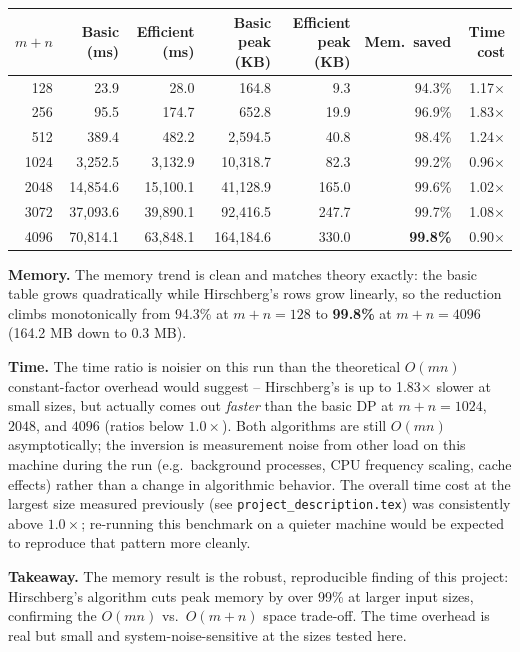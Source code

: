 \documentclass[11pt]{article}
\begin{document}
\begin{center}
\begin{tabular}{r r r r r r r}
\toprule
$m+n$ & Basic (ms) & Efficient (ms) & Basic peak (KB) & Efficient peak (KB) & Mem.\ saved & Time cost \\
\midrule
128  & 23.9    & 28.0    & 164.8     & 9.3   & 94.3\% & 1.17$\times$ \\
256  & 95.5    & 174.7   & 652.8     & 19.9  & 96.9\% & 1.83$\times$ \\
512  & 389.4   & 482.2   & 2{,}594.5 & 40.8  & 98.4\% & 1.24$\times$ \\
1024 & 3{,}252.5 & 3{,}132.9 & 10{,}318.7 & 82.3  & 99.2\% & 0.96$\times$ \\
2048 & 14{,}854.6 & 15{,}100.1 & 41{,}128.9 & 165.0 & 99.6\% & 1.02$\times$ \\
3072 & 37{,}093.6 & 39{,}890.1 & 92{,}416.5 & 247.7 & 99.7\% & 1.08$\times$ \\
4096 & 70{,}814.1 & 63{,}848.1 & 164{,}184.6 & 330.0 & \textbf{99.8\%} & 0.90$\times$ \\
\bottomrule
\end{tabular}
\end{center}

\textbf{Memory.} The memory trend is clean and matches theory exactly: the
basic table grows quadratically while Hirschberg's rows grow linearly, so the
reduction climbs monotonically from 94.3\% at $m+n=128$ to \textbf{99.8\%} at
$m+n=4096$ (164.2 MB down to 0.3 MB).

\textbf{Time.} The time ratio is noisier on this run than the theoretical
$O(mn)$ constant-factor overhead would suggest -- Hirschberg's is up to
1.83$\times$ slower at small sizes, but actually comes out \emph{faster} than
the basic DP at $m+n = 1024$, $2048$, and $4096$ (ratios below $1.0\times$).
Both algorithms are still $O(mn)$ asymptotically; the inversion is measurement
noise from other load on this machine during the run (e.g.\ background
processes, CPU frequency scaling, cache effects) rather than a change in
algorithmic behavior. The overall time cost at the largest size measured
previously (see \texttt{project\_description.tex}) was consistently above
$1.0\times$; re-running this benchmark on a quieter machine would be expected
to reproduce that pattern more cleanly.

\textbf{Takeaway.} The memory result is the robust, reproducible finding of
this project: Hirschberg's algorithm cuts peak memory by over 99\% at larger
input sizes, confirming the $O(mn)$ vs.\ $O(m+n)$ space trade-off. The time
overhead is real but small and system-noise-sensitive at the sizes tested
here.
\end{document}
